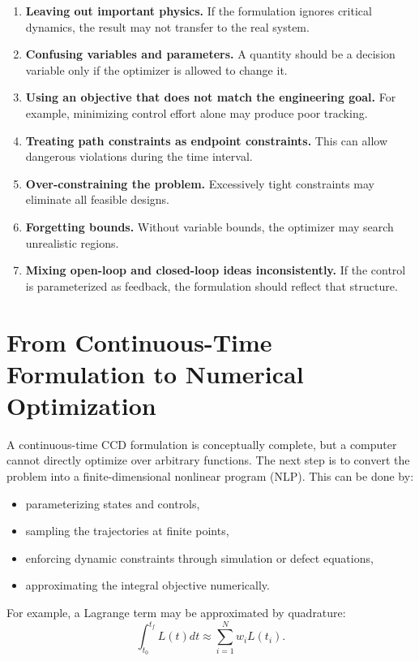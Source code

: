 \documentclass[11pt]{article}
\begin{document}
\begin{enumerate}[leftmargin=1.5em]
  \item \textbf{Leaving out important physics.} If the formulation ignores critical dynamics, the result may not transfer to the real system.
  \item \textbf{Confusing variables and parameters.} A quantity should be a decision variable only if the optimizer is allowed to change it.
  \item \textbf{Using an objective that does not match the engineering goal.} For example, minimizing control effort alone may produce poor tracking.
  \item \textbf{Treating path constraints as endpoint constraints.} This can allow dangerous violations during the time interval.
  \item \textbf{Over-constraining the problem.} Excessively tight constraints may eliminate all feasible designs.
  \item \textbf{Forgetting bounds.} Without variable bounds, the optimizer may search unrealistic regions.
  \item \textbf{Mixing open-loop and closed-loop ideas inconsistently.} If the control is parameterized as feedback, the formulation should reflect that structure.
\end{enumerate}

\section{From Continuous-Time Formulation to Numerical Optimization}

A continuous-time CCD formulation is conceptually complete, but a computer cannot directly optimize over arbitrary functions. The next step is to convert the problem into a finite-dimensional nonlinear program (NLP). This can be done by:
\begin{itemize}[leftmargin=1.4em]
  \item parameterizing states and controls,
  \item sampling the trajectories at finite points,
  \item enforcing dynamic constraints through simulation or defect equations,
  \item approximating the integral objective numerically.
\end{itemize}

For example, a Lagrange term may be approximated by quadrature:
\begin{equation}
\int_{t_0}^{t_f} L(t)dt \approx \sum_{i=1}^{N} w_i L(t_i).
\end{equation}
\end{document}
